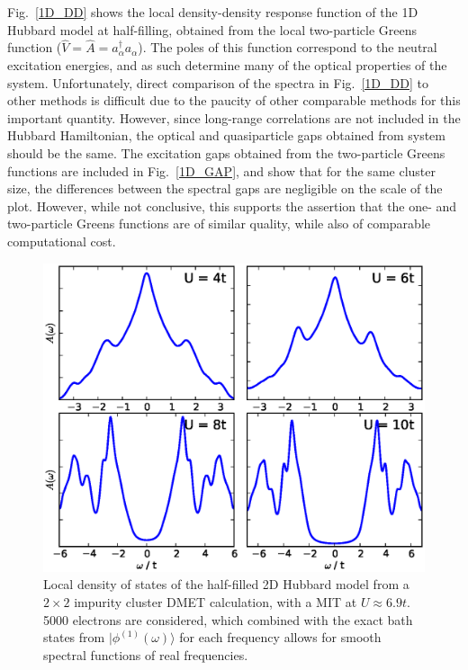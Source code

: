 \documentclass[aps,showpacs,twocolumn,nobibnotes]{revtex4}
\begin{document}
Fig.~\ref{1D_DD} shows the local density-density response function of the 1D Hubbard model at half-filling, obtained from the local two-particle Greens 
function (${\hat V}={\hat A}=a_{\alpha}^{\dagger}a_{\alpha}$). The poles of this function correspond to the neutral excitation energies, and as such determine 
many of the optical properties of the system\cite{Millis2012,Essler91}.
Unfortunately, direct comparison of the spectra in Fig.~\ref{1D_DD} to other methods is difficult due to the paucity of other comparable methods for this important quantity.
However, since long-range correlations are not included in the Hubbard Hamiltonian, 
the optical and quasiparticle gaps obtained from system should be the same. The excitation gaps
obtained from the two-particle Greens functions are included in Fig.~\ref{1D_GAP}, and show that for the same cluster size, the differences between the spectral gaps are negligible 
on the scale of the plot. However, while not conclusive, this supports the assertion that the one- and two-particle Greens functions are of similar quality, while also of comparable computational cost.

\begin{figure}
\begin{center}
    \vspace{-2mm}
\includegraphics[scale=0.475]{Plots/2D_Spectra/2DHub_Spectra.eps}
\end{center}
    \vspace{-8mm}
\caption{Local density of states of the half-filled 2D Hubbard model from a $2 \times 2$ impurity cluster DMET calculation, with a MIT at $U\approx6.9t$. 5000 electrons are considered,
which combined with the exact bath states from $|\phi^{(1)}(\omega)\rangle$ for each frequency allows for smooth spectral functions of real frequencies.}
\label{2D_DOS}
\end{figure}
\end{document}
